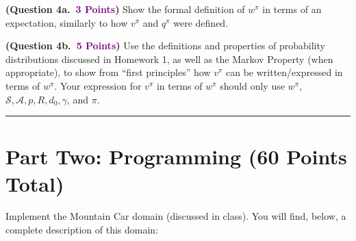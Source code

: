 \documentclass{article}
\newcommand{\POINTS}[1]{\textcolor{purple}{\textbf{{#1}}}}
\begin{document}
\begin{enumerate}
    \textbf{(Question 4a.~\POINTS{3 Points})} Show the formal definition of $w^\pi$ in terms of an expectation, similarly to how $v^\pi$ and $q^\pi$ were defined.


    \textbf{(Question 4b.~\POINTS{5 Points})} Use the definitions and properties of probability distributions discussed in Homework 1, as well as the Markov Property (when appropriate), to show from ``first principles'' how $v^\pi$ can be written/expressed in terms of $w^\pi$. Your expression for $v^\pi$ in terms of $w^\pi$ should only use $w^\pi$, $\mathcal{S}, \mathcal{A}, p, R, d_0, \gamma$, and $\pi$.
    

\end{enumerate}


\vspace{0.5cm}
\noindent\rule{\textwidth}{1pt}
\section*{Part Two: Programming (60 Points Total)}

Implement the Mountain Car domain (discussed in class). You will find, below, a complete description of this domain:
\end{document}
